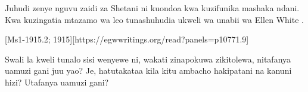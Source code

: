 Juhudi zenye nguvu zaidi za Shetani ni kuondoa  kwa kuzifunika mashaka ndani. Kwa kuzingatia mtazamo wa leo tunashuhudia ukweli wa unabii wa Ellen White .

[Ms1-1915.2; 1915][https://egwwritings.org/read?panels=p10771.9]

Swali la kweli tunalo sisi wenyewe ni, wakati  zinapokuwa zikitolewa, nitafanya uamuzi gani juu yao? Je, hatutakataa kila kitu ambacho hakipatani na kanuni hizi? Utafanya uamuzi gani?


